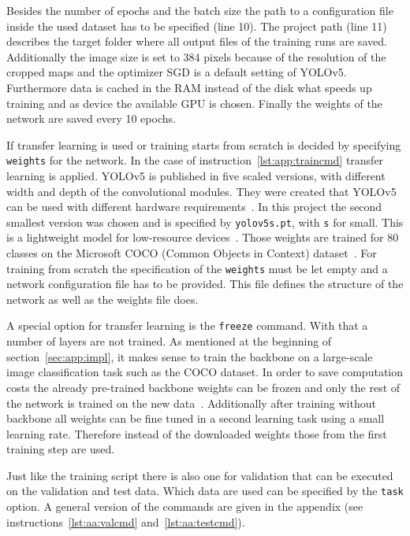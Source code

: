 Besides the number of epochs and the batch size the path to a configuration file inside the used 
dataset has to be specified (line 10). The project path (line 11) describes the target folder where all 
output files of the training runs are saved. Additionally the image size is set to 384 pixels because of 
the resolution of the cropped maps and the optimizer SGD is a default setting of YOLOv5. 
Furthermore data is cached in the RAM instead of the disk what speeds up training and as device the 
available GPU is chosen. Finally the weights of the network are saved every 10 epochs.

If transfer learning is used or training starts from scratch is decided by specifying \texttt{weights} 
for the network. In the case of instruction~\ref{lst:app:traincmd} transfer learning is applied. YOLOv5 
is published in five scaled versions, with different width and depth of the convolutional modules. 
They were created that YOLOv5 can be used with different hardware 
requirements~\cite{jocher2020, terven2023}. In this project the second smallest version was chosen 
and is specified by \texttt{yolov5s.pt}, with \texttt{s} for small. This is a lightweight model for 
low-resource devices~\cite{terven2023}. Those weights are trained for 80 classes on the Microsoft 
COCO (Common Objects in Context) dataset~\cite{lin2014, jocher2020}. For training from scratch 
the specification of the \texttt{weights} must be let empty and a network configuration file has to be 
provided. This file defines the structure of the network as well as the weights file does.

A special option for transfer learning is the \texttt{freeze} command. With that a number of 
layers are not trained. As mentioned at the beginning of section~\ref{sec:app:impl}, it makes sense 
to train the backbone on a large-scale image classification task such as the COCO dataset. In order 
to save computation costs the already pre-trained backbone weights can be frozen and only the rest 
of the network is trained on the new data~\cite{y5TransfLearn}. Additionally after training without 
backbone all weights can be fine tuned in a second learning task using a small learning rate. 
Therefore instead of the downloaded weights those from the first training step are used.

Just like the training script there is also one for validation that can be executed on the validation and 
test data. Which data are used can be specified by the \texttt{task} option. A general version of the 
commands are given in the appendix (see instructions~\ref{lst:aa:valcmd} and~\ref{lst:aa:testcmd}).


